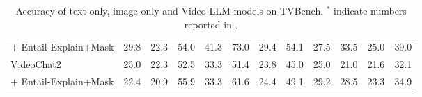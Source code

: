 \begin{table}[t]
\begin{adjustbox}{width=\columnwidth}
\begin{tabular}{lcccccccccc>{\columncolor{gray!10}}c}
$+$ Entail-Explain+Mask & 29.8 & 22.3 & 54.0 & 41.3 & 73.0 & 29.4 & 54.1 & 27.5 & 33.5 & 25.0 & 39.0 \\
\arrayrulecolor{gray!50}
\hdashline
\rowcolor[HTML]{F2F3F4} 
VideoChat2 & 25.0 & 22.3 & 52.5 & 33.3 & 51.4 & 23.8 & 45.0 & 25.0 & 21.0 & 21.6 & 32.1 \\
\hdashline
\arrayrulecolor{black}
$+$ Entail-Explain+Mask & 22.4 & 20.9 & 55.9 & 33.3 & 61.6 & 24.4 & 49.1 & 29.2 & 28.5 & 23.3 & 34.9 \\
\bottomrule
\end{tabular}
\end{adjustbox}
\caption{Accuracy of text-only, image only and Video-LLM models on TVBench. $^*$ indicate numbers reported in \cite{cores2024tvbench}.  }
\label{table:tvbench}
\end{table}








